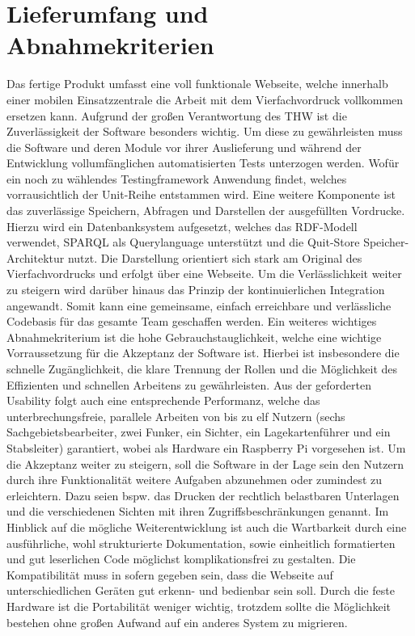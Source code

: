 \section{Lieferumfang und Abnahmekriterien}
Das fertige Produkt umfasst eine voll funktionale Webseite, welche innerhalb einer mobilen Einsatzzentrale die Arbeit mit dem Vierfachvordruck vollkommen ersetzen kann. Aufgrund der großen Verantwortung des THW ist die Zuverlässigkeit der Software besonders wichtig. Um diese zu gewährleisten muss die Software und deren Module vor ihrer Auslieferung und während der Entwicklung vollumfänglichen automatisierten Tests unterzogen werden. Wofür ein noch zu wählendes Testingframework Anwendung findet, welches vorrausichtlich der Unit-Reihe entstammen wird. Eine weitere Komponente ist das zuverlässige Speichern, Abfragen und Darstellen der ausgefüllten Vordrucke. Hierzu wird ein Datenbanksystem aufgesetzt, welches das RDF-Modell verwendet, SPARQL als Querylanguage unterstützt und die Quit-Store Speicher-Architektur nutzt. Die Darstellung orientiert sich stark am Original des Vierfachvordrucks und erfolgt über eine Webseite. Um die Verlässlichkeit weiter zu steigern wird darüber hinaus das Prinzip der kontinuierlichen Integration angewandt. Somit kann eine gemeinsame, einfach erreichbare und verlässliche Codebasis für das gesamte Team geschaffen werden. Ein weiteres wichtiges Abnahmekriterium ist die hohe Gebrauchstauglichkeit, welche eine wichtige Vorraussetzung für die Akzeptanz der Software ist. Hierbei ist insbesondere die schnelle Zugänglichkeit, die klare Trennung der Rollen und die Möglichkeit des Effizienten und schnellen Arbeitens zu gewährleisten. Aus der geforderten Usability folgt auch eine entsprechende Performanz, welche das unterbrechungsfreie, parallele Arbeiten von bis zu elf Nutzern (sechs Sachgebietsbearbeiter, zwei Funker, ein Sichter, ein Lagekartenführer und ein Stabsleiter) garantiert, wobei als Hardware ein Raspberry Pi vorgesehen ist. Um die Akzeptanz weiter zu steigern, soll die Software in der Lage sein den Nutzern durch ihre Funktionalität weitere Aufgaben abzunehmen oder zumindest zu erleichtern. Dazu seien bspw. das Drucken der rechtlich belastbaren Unterlagen und die verschiedenen Sichten mit ihren Zugriffsbeschränkungen genannt. Im Hinblick auf die mögliche Weiterentwicklung ist auch die Wartbarkeit durch eine ausführliche, wohl strukturierte Dokumentation, sowie einheitlich formatierten und gut leserlichen Code möglichst komplikationsfrei zu gestalten. Die Kompatibilität muss in sofern gegeben sein, dass die Webseite auf unterschiedlichen Geräten gut erkenn- und bedienbar sein soll. Durch die feste Hardware ist die Portabilität weniger wichtig, trotzdem sollte die Möglichkeit bestehen ohne großen Aufwand auf ein anderes System zu migrieren. 